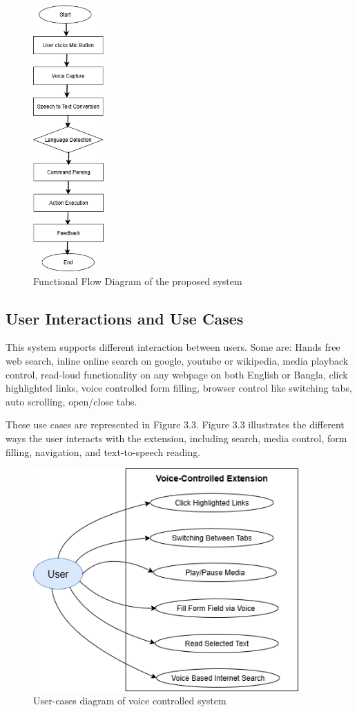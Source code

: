 \begin{figure}[H]
   \centering
   \includegraphics[height=4in]{latex/Chap3/Flow-diagram.png}
   \caption{Functional Flow Diagram of the proposed system}
   \label{fig:flow-diagram}
\end{figure}
 
\subsection{User Interactions and Use Cases}
This system supports different interaction between users. Some are: Hands free web search, inline online search on google, youtube or wikipedia, media playback control, read-loud functionality on any webpage on both English or Bangla, click highlighted links, voice controlled form filling, browser control like switching tabs, auto scrolling, open/close tabs.

These use cases are represented in Figure 3.3.
Figure 3.3 illustrates the different ways the user interacts with the extension, including search, media control, form filling, navigation, and text-to-speech reading.

\begin{figure}[H]
   \centering
   \includegraphics[width=4in]{latex/Chap3/User-Cases-Diagram.png}
   \caption{User-cases diagram of voice controlled system}
   \label{fig:usr-cases-diagram}
\end{figure}


